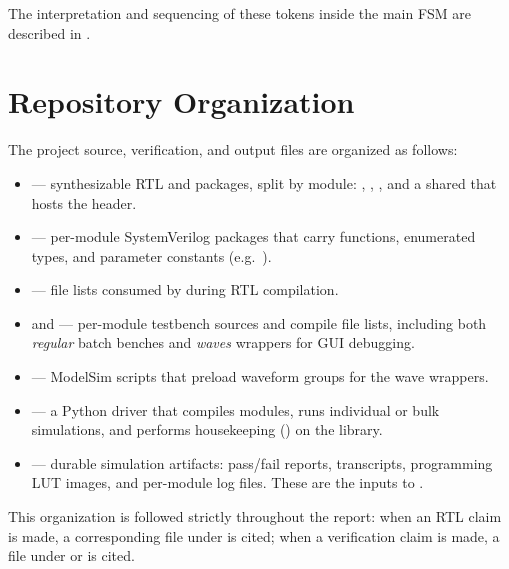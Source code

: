 The interpretation and sequencing of these tokens inside the main FSM are
described in .

\section{Repository Organization}
\label{sec:arch-repo}

The project source, verification, and output files are organized as
follows:

\begin{itemize}
    \item {} --- synthesizable RTL and packages, split by module:
          , ,
          , and a shared 
          that hosts the  header.
    \item {} --- per-module SystemVerilog packages
          that carry functions, enumerated types, and parameter
          constants (e.g.\ ).
    \item {} --- file lists consumed by
           during RTL compilation.
    \item {} and  --- per-module
          testbench sources and compile file lists, including both
          \emph{regular} batch benches and \emph{waves} wrappers for GUI
          debugging.
    \item {} --- ModelSim  scripts that
          preload waveform groups for the wave wrappers.
    \item {} --- a Python driver that compiles
          modules, runs individual or bulk simulations, and performs
          housekeeping () on the  library.
    \item {} --- durable simulation artifacts: pass/fail
          reports, transcripts, programming LUT images, and per-module
          log files. These are the inputs to .
\end{itemize}

This organization is followed strictly throughout the report: when an
RTL claim is made, a corresponding file under  is cited; when
a verification claim is made, a file under  or 
is cited.

